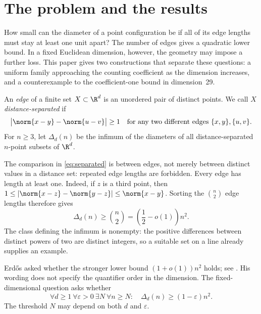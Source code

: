 \section{The problem and the results}\label{sec:intro}

How small can the diameter of a point configuration be if all of its edge
lengths must stay at least one unit apart? The number of edges gives a
quadratic lower bound. In a fixed Euclidean dimension, however, the geometry
may impose a further loss. This paper gives two constructions that separate
these questions: a uniform family approaching the counting coefficient as
the dimension increases, and a counterexample to the coefficient-one bound
in dimension~29.

\begin{definition}
An \emph{edge} of a finite set $X\subset\R^d$ is an unordered pair of distinct
points. We call $X$ \emph{distance-separated} if
\begin{equation}\label{eq:separated}
 \bigl|\norm{x-y}-\norm{u-v}\bigr|\ge1
 \quad\text{for any two different edges }\{x,y\},\{u,v\}.
\end{equation}
For $n\ge3$, let $\Delta_d(n)$ be the infimum of the diameters of all
distance-separated $n$-point subsets of $\R^d$.
\end{definition}

The comparison in \eqref{eq:separated} is between edges, not merely between
distinct values in a distance set: repeated edge lengths are forbidden.
Every edge has length at least one. Indeed, if $z$ is a third point, then
$1\le|\norm{x-z}-\norm{y-z}|\le\norm{x-y}$. Sorting the $\binom n2$ edge
lengths therefore gives
\begin{equation}\label{eq:counting}
 \Delta_d(n)\ge\binom n2=\left(\frac12-o(1)\right)n^2.
\end{equation}
The class defining the infimum is nonempty: the positive differences between
distinct powers of two are distinct integers, so a suitable set on a line
already supplies an example.

Erd\H{o}s asked whether the stronger lower bound $(1+o(1))n^2$ holds;
see \cite[Problem~20]{Erdos}. His wording does not specify the quantifier
order in the dimension. The fixed-dimensional question asks whether
\begin{equation}\label{eq:conjecture}
 \forall d\ge1\ \forall\varepsilon>0\ \exists N\ \forall n\ge N:
 \quad \Delta_d(n)\ge(1-\varepsilon)n^2.
\end{equation}
The threshold $N$ may depend on both $d$ and $\varepsilon$.

